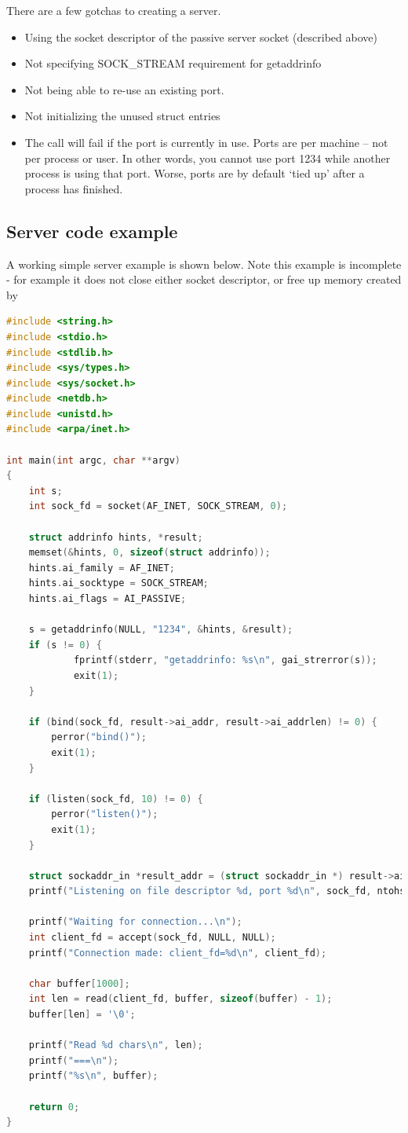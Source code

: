 There are a few gotchas to creating a server.

\begin{itemize}
\tightlist
\item
  Using the socket descriptor of the passive server socket (described above)
\item
  Not specifying SOCK\_STREAM requirement for getaddrinfo
\item
  Not being able to re-use an existing port.
\item
  Not initializing the unused struct entries
\item
  The  call will fail if the port is currently in use. Ports are per machine -- not per process or user.
  In other words, you cannot use port 1234 while another process is using that port.
  Worse, ports are by default `tied up' after a process has finished.
\end{itemize}

\subsection{Server code example}

A working simple server example is shown below.
Note this example is incomplete - for example it does not close either socket descriptor, or free up memory created by 

\begin{lstlisting}[language=C]
#include <string.h>
#include <stdio.h>
#include <stdlib.h>
#include <sys/types.h>
#include <sys/socket.h>
#include <netdb.h>
#include <unistd.h>
#include <arpa/inet.h>

int main(int argc, char **argv)
{
    int s;
    int sock_fd = socket(AF_INET, SOCK_STREAM, 0);

    struct addrinfo hints, *result;
    memset(&hints, 0, sizeof(struct addrinfo));
    hints.ai_family = AF_INET;
    hints.ai_socktype = SOCK_STREAM;
    hints.ai_flags = AI_PASSIVE;

    s = getaddrinfo(NULL, "1234", &hints, &result);
    if (s != 0) {
            fprintf(stderr, "getaddrinfo: %s\n", gai_strerror(s));
            exit(1);
    }

    if (bind(sock_fd, result->ai_addr, result->ai_addrlen) != 0) {
        perror("bind()");
        exit(1);
    }

    if (listen(sock_fd, 10) != 0) {
        perror("listen()");
        exit(1);
    }

    struct sockaddr_in *result_addr = (struct sockaddr_in *) result->ai_addr;
    printf("Listening on file descriptor %d, port %d\n", sock_fd, ntohs(result_addr->sin_port));

    printf("Waiting for connection...\n");
    int client_fd = accept(sock_fd, NULL, NULL);
    printf("Connection made: client_fd=%d\n", client_fd);

    char buffer[1000];
    int len = read(client_fd, buffer, sizeof(buffer) - 1);
    buffer[len] = '\0';

    printf("Read %d chars\n", len);
    printf("===\n");
    printf("%s\n", buffer);

    return 0;
}
\end{lstlisting}

